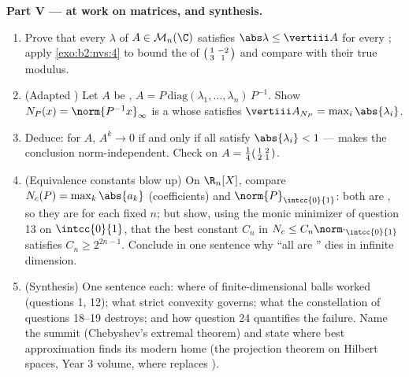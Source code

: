 \begin{problem}
\medskip
\noindent\textbf{Part V ---  at work on matrices, and
synthesis.}
\begin{enumerate}[resume]
  \item Prove that every  $\lambda$ of $A \in
        \mathcal{M}_n(\C)$ satisfies $\abs\lambda \leq
        \vertiii A$ for every ; apply
        \cref{exo:b2:nvs:4} to bound the  of
        $\begin{psmallmatrix}1 & -2\\ 3 & 1\end{psmallmatrix}$
        and compare with their true modulus.
  \item (Adapted ) Let $A$ be , $A =
        P\,\mathrm{diag}(\lambda_1, \dots, \lambda_n)\,P^{-1}$.
        Show $N_P(x) = \norm{P^{-1}x}_\infty$ is a  whose
         satisfies $\vertiii A_{N_P} =
        \max_i\abs{\lambda_i}$.
  \item Deduce: for  $A$, $A^k \to 0$ if and only
        if all  satisfy $\abs{\lambda_i} < 1$ ---
         makes the conclusion
        norm-independent. Check on $A =
        \frac14\begin{psmallmatrix}1 & 2\\ 2 &
        1\end{psmallmatrix}$.
  \item (Equivalence constants blow up) On $\R_n[X]$, compare
        $N_c(P) = \max_k \abs{a_k}$ (coefficients) and
        $\norm{P}_{\intcc{0}{1}}$: both are , so they are
         for each fixed $n$; but show, using the monic
        minimizer of question 13 on $\intcc{0}{1}$, that the
        best constant $C_n$ in $N_c \leq
        C_n\norm\cdot_{\intcc{0}{1}}$ satisfies $C_n \geq
        2^{2n-1}$. Conclude in one sentence why ``all  are
        '' dies in infinite dimension.
  \item (Synthesis) One sentence each: where  of
        finite-dimensional balls worked (questions 1, 12); what
        strict convexity governs; what the constellation of
        questions 18--19 destroys; and how question 24
        quantifies the failure. Name the summit (Chebyshev's
        extremal theorem) and state where best approximation
        finds its modern home (the projection theorem on Hilbert
        spaces, Year 3 volume, where  replaces
        ).
\end{enumerate}
\end{problem}

